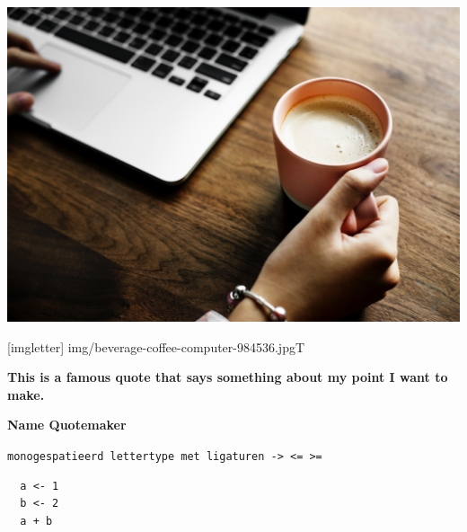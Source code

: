 \documentclass[aspectratio=169]{beamer}
\begin{document}
\begin{frame}
  \includegraphics[width=\textwidth]{img/beverage-coffee-computer-984536.jpg}
\end{frame}


{
[imgletter]%
  {img/beverage-coffee-computer-984536.jpg}{T}

\begin{frame}

  {\huge \textbf{This is a famous quote that says something about my point I want to make.}}
  
  \bigskip
  
  \textbf{Name Quotemaker}

\end{frame}
}

\begin{frame}[fragile]
  \texttt{monogespatieerd lettertype met ligaturen -> <= >=}

  \begin{verbatim}
  a <- 1
  b <- 2
  a + b
  \end{verbatim}
\end{frame}
\end{document}
